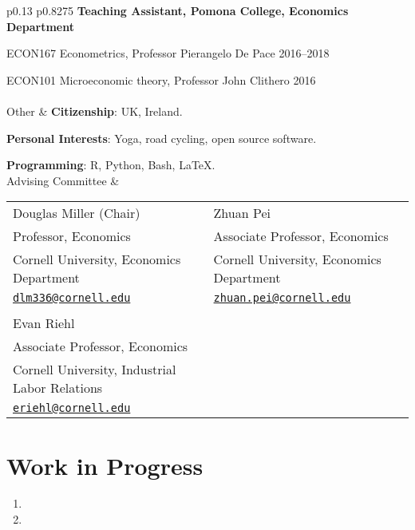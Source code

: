 \documentclass[letterpaper,11pt,oneside]{article}
\begin{document}
\begin{tabular}[\textwidth]{p{} p{}}
    \vspace{0.1cm}
    \textbf{Teaching Assistant, Pomona College, Economics Department}
    
    ECON167 Econometrics, Professor Pierangelo De Pace \hfill 2016--2018

    ECON101 Microeconomic theory, Professor John Clithero \hfill 2016 \\

\\[15ex]
\Large{Other}
    & \textbf{Citizenship}: UK, Ireland.
    
    \textbf{Personal Interests}: Yoga, road cycling, open source software.
    
    \textbf{Programming}: R, Python, Bash, \LaTeX. \vspace{0.2cm} \\

\Large{Advising Committee}
    & \begin{tabular}[t]{@{} l l}
        Douglas Miller (Chair)                   & Zhuan Pei                                \\
        Professor, Economics                     & Associate Professor, Economics           \\
        Cornell University, Economics Department & Cornell University, Economics Department \\
        \href{mailto:dlm336@cornell.edu}{\nolinkurl{dlm336@cornell.edu}}
            & \href{mailto:zhuan.pei@cornell.edu}{\nolinkurl{zhuan.pei@cornell.edu}}            \\ \\
        Evan Riehl                                     \\
        Associate Professor, Economics                 \\
        Cornell University, Industrial Labor Relations \\
        \href{mailto:eriehl@cornell.edu}{\nolinkurl{eriehl@cornell.edu}}
    \end{tabular}
\end{tabular}

\newpage
\onehalfspacing
\restoregeometry
{}

\section*{Work in Progress}
\begin{enumerate}[itemsep=2.5pt, label={}]
    \item {}
    \item {}
\end{enumerate}
\end{document}

